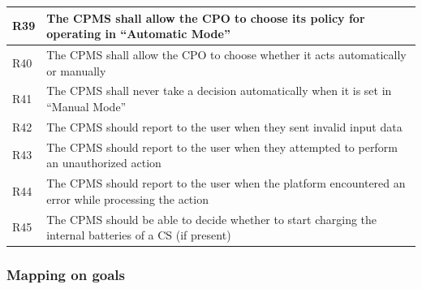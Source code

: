 \documentclass[11pt]{article}
\begin{document}
\begin{table}[H]
\begin{tabularx}{\textwidth}{|>{\centering\hsize=0.1\hsize}X|>{\hsize=1.9\hsize}X|}
        \hline
        R39 & The CPMS shall allow the CPO to choose its policy for operating in “Automatic Mode” \\
        \hline
        R40 & The CPMS shall allow the CPO to choose whether it acts automatically or manually \\
        \hline
        R41 & The CPMS shall never take a decision automatically when it is set in “Manual Mode” \\
        \hline
        R42 & The CPMS should report to the user when they sent invalid input data \\
        \hline
        R43 & The CPMS should report to the user when they attempted to perform an unauthorized action \\
        \hline
        R44 & The CPMS should report to the user when the platform encountered an error while processing the action \\
        \hline
        R45 & The CPMS should be able to decide whether to start charging the internal batteries of a CS (if present) \\
        \hline
    \end{tabularx}
    \label{tab:requirements-2}
\end{table}

\subsubsection{Mapping on goals}
\end{document}
